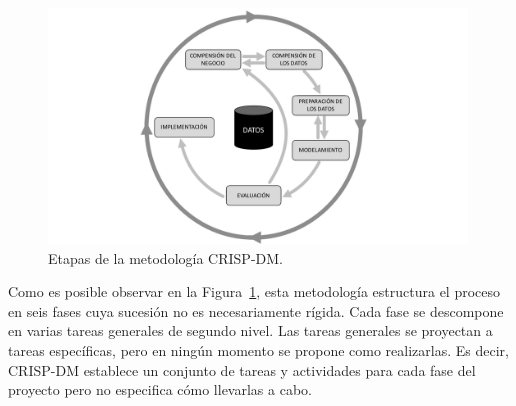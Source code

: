 \begin{figure}[H]
  \centering
    \includegraphics[width=0.99\textwidth]{Figuras/CRISP}
      \caption{Etapas de la metodología CRISP-DM.}
    \label{fig:crisp}
\end{figure}

Como es posible observar en la Figura~\ref{fig:crisp}, esta metodología estructura el proceso en seis fases cuya sucesión no es necesariamente rígida. Cada fase se descompone en varias tareas generales de segundo nivel. Las tareas generales se proyectan a tareas específicas, pero en ningún momento se propone como realizarlas. Es decir, CRISP-DM establece un conjunto de tareas y actividades para cada fase del proyecto pero no especifica cómo llevarlas a cabo.


